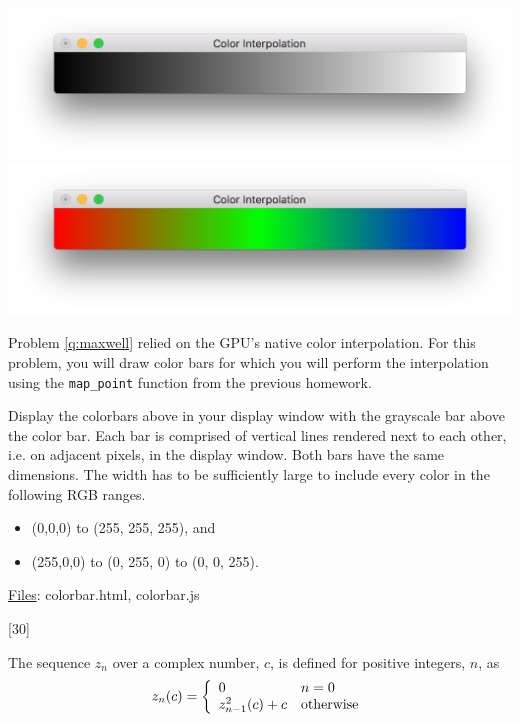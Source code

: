 \documentclass[addpoints]{exam}
\begin{document}
\begin{questions}
  \begin{center}
    \includegraphics[width=\linewidth]{barbw}\\
    \vspace{-75pt}\includegraphics[width=\linewidth]{barrgb}
  \end{center}
  \vspace{-25pt}Problem \ref{q:maxwell} relied on the GPU's native color interpolation. For this problem, you will draw color bars for which you will perform the interpolation using the {\tt map\_point} function from the previous homework.

  Display the colorbars above in your display window with the grayscale bar above the color bar. Each bar is comprised of vertical lines rendered next to each other, i.e. on adjacent pixels, in the display window. Both bars have the same dimensions. The width has to be sufficiently large to include every color in the following RGB ranges.
  \begin{itemize}
  \item (0,0,0) to (255, 255, 255), and
  \item (255,0,0) to (0, 255, 0) to (0, 0, 255).
  \end{itemize}
  \noindent\underline{Files}: colorbar.html, colorbar.js

  [30]

  The sequence $z_n$ over a complex number, $c$, is defined for positive integers, $n$, as
  \[
    z_n(c) = \left\{
      \begin{array}{l@{\quad}l}
        0 & n = 0\\
        z^2_{n-1}(c)+c & \textrm{otherwise}
      \end{array}
    \right.
  \]


\end{questions}
\end{document}
